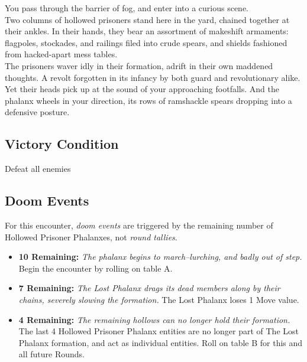 You pass through the barrier of fog, and enter into a curious scene.\\

Two columns of hollowed prisoners stand here in the yard, chained together at their ankles. In their hands, they bear an assortment of makeshift armaments: flagpoles, stockades, and railings filed into crude spears, and shields fashioned from hacked-apart mess tables.\\

The prisoners waver idly in their formation, adrift in their own maddened thoughts. A revolt forgotten in its infancy by both guard and revolutionary alike. Yet their heads pick up at the sound of your approaching footfalls. And the phalanx wheels in your direction, its rows of ramshackle spears dropping into a defensive posture.

\subsection*{Victory Condition}
Defeat all enemies

\subsection*{Doom Events}
For this encounter, \emph{doom events} are triggered by the remaining number of Hollowed Prisoner Phalanxes, not \emph{round tallies}.

\begin{itemize}
\item \textbf{10 Remaining:} \emph{The phalanx begins to march--lurching, and badly out of step.} Begin the encounter by rolling on table A.
\item \textbf{7 Remaining:} \emph{The Lost Phalanx drags its dead members along by their chains, severely slowing the formation.} The Lost Phalanx loses 1 Move value.
\item \textbf{4 Remaining:} \emph{The remaining hollows can no longer hold their formation.} The last 4 Hollowed Prisoner Phalanx entities are no longer part of The Lost Phalanx formation, and act as individual entities. Roll on table B for this and all future Rounds.
\end{itemize}

\pagebreak

